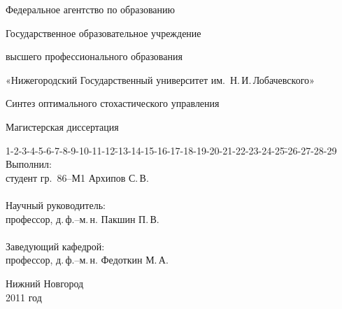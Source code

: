 
\begin{titlepage}
	\begin{center}
		\par Федеральное агентство по образованию\vspace{0.7mm}
		\par Государственное образовательное учреждение\vspace{0.7mm}
		\par высшего профессионального образования\vspace{1.5mm}
		\par «Нижегородский Государственный университет им.~Н.\,И.\,Лобачевского»
		\vspace{1cm}
		{\fontsize{18pt}{9mm}  \selectfont
            \par Синтез оптимального стохастического управления
        }
        \vspace{2cm}
        \par {\large Магистерская диссертация}
    \end{center}
    \vspace{2cm}
    \begin{tabbing}
        1-2-3-4-5-6-7-8-9-10-11-12\=-13-14-15-16-17-18-19-20-21-22-23-24-25\=-26-27-28-29 \kill
        {\fontsize{10pt}{10pt} \selectfont Выполнил:}                 \>                      \>                 \\
        {\fontsize{10pt}{10pt} \selectfont студент гр.~86--М1}        \>                      \> {\fontsize{10pt}{10pt} \selectfont Архипов С.\,В.}  \\
        \\
        {\fontsize{10pt}{10pt} \selectfont Научный руководитель:}     \>                      \>                 \\
        {\fontsize{10pt}{10pt} \selectfont профессор, д.\,ф.--м.\,н.} \>                      \> {\fontsize{10pt}{10pt} \selectfont Пакшин П.\,В.}   \\
        \\
        {\fontsize{10pt}{10pt} \selectfont Заведующий кафедрой:}     \>                      \>                 \\
        {\fontsize{10pt}{10pt} \selectfont профессор, д.\,ф.--м.\,н.} \>                      \> {\fontsize{10pt}{10pt} \selectfont Федоткин М.\,А.}
    \end{tabbing}
    \vspace{3cm}
    \begin{center} {\fontsize{10pt}{3mm}  \selectfont
        Нижний Новгород \\
        2011 год
    } \end{center}
\end{titlepage}

